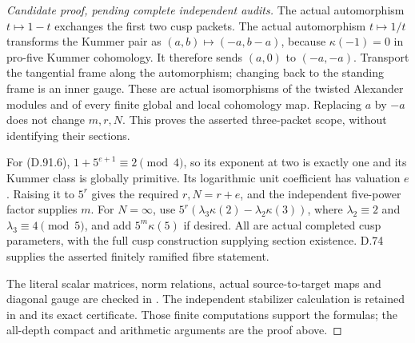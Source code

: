 \begin{proof}[Candidate proof, pending complete independent audits]
The actual automorphism \(t\mapsto1-t\) exchanges the
first two cusp packets. The actual automorphism
\(t\mapsto1/t\) transforms the Kummer pair as
\((a,b)\mapsto(-a,b-a)\), because \(\kappa(-1)=0\)
in pro-five Kummer cohomology. It therefore sends
\((a,0)\) to \((-a,-a)\). Transport the tangential
frame along the automorphism; changing back to the standing
frame is an inner gauge. These are actual isomorphisms of
the twisted Alexander modules and of every finite global
and local cohomology map. Replacing \(a\) by \(-a\)
does not change \(m,r,N\). This proves the asserted
three-packet scope, without identifying their sections.

For (D.91.6), \(1+5^{e+1}\equiv2\pmod4\), so
its exponent at two is exactly one and its Kummer class
is globally primitive. Its logarithmic unit coefficient
has valuation \(e\). Raising it to \(5^r\) gives
the required \(r,N=r+e\), and the independent five-power
factor supplies \(m\). For \(N=\infty\), use
\(5^r(\lambda_3\kappa(2)-\lambda_2\kappa(3))\),
where \(\lambda_2\equiv2\) and \(\lambda_3\equiv4\pmod5\),
and add \(5^m\kappa(5)\) if desired. All are actual
completed cusp parameters, with the full cusp construction
supplying section existence. D.74 supplies the asserted
finitely ramified fibre statement.

The literal scalar matrices, norm relations, actual
source-to-target maps and diagonal gauge are checked in
.
The independent stabilizer calculation is retained in
 and its
exact certificate. Those finite computations support the
formulas; the all-depth compact and arithmetic arguments
are the proof above.
\end{proof}
